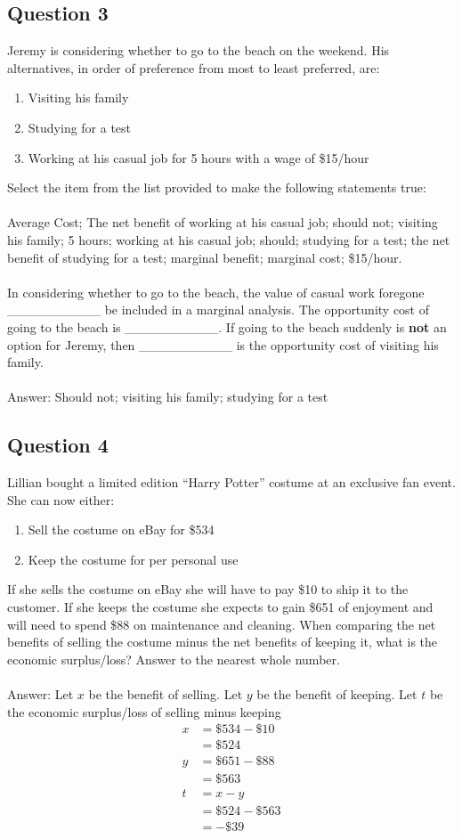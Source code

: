 \subsection{Question 3}
Jeremy is considering whether to go to the beach on the weekend. His alternatives, in order of preference from most to least preferred, are:
\begin{enumerate}
	\item Visiting his family
	\item Studying for a test
	\item Working at his casual job for 5 hours with a wage of \$15/hour
\end{enumerate}
Select the item from the list provided to make the following statements true:\\\\
Average Cost; The net benefit of working at his casual job; should not; visiting his family; 5 hours; working at his casual job; should; studying for a test; the net benefit of studying for a test; marginal benefit; marginal cost; \$15/hour.\\\\
In considering whether to go to the beach, the value of casual work foregone \_\_\_\_\_\_\_\_\_\_ be included in a marginal analysis. The opportunity cost of going to the beach is \_\_\_\_\_\_\_\_\_\_. If going to the beach suddenly is \textbf{not} an option for Jeremy, then \_\_\_\_\_\_\_\_\_\_ is the opportunity cost of visiting his family.\\\\
Answer: Should not; visiting his family; studying for a test

\subsection{Question 4}
Lillian bought a limited edition ``Harry Potter'' costume at an exclusive fan event. She can now either:
\begin{enumerate}
	\item Sell the costume on eBay for \$534
	\item Keep the costume for per personal use
\end{enumerate}
If she sells the costume on eBay she will have to pay \$10 to ship it to the customer. If she keeps the costume she expects to gain \$651 of enjoyment and will need to spend \$88 on maintenance and cleaning. When comparing the net benefits of selling the costume minus the net benefits of keeping it, what is the economic surplus/loss? Answer to the nearest whole number.\\\\
Answer:
Let $x$ be the benefit of selling. Let $y$ be the benefit of keeping. Let $t$ be the economic surplus/loss of selling minus keeping
\begin{align*}
	x &= \$534 - \$10\\
	&= \$524\\
	y &= \$651 - \$88\\
	&= \$563\\
	t &= x - y\\
	&= \$524 - \$563\\
	&= -\$39
\end{align*}

